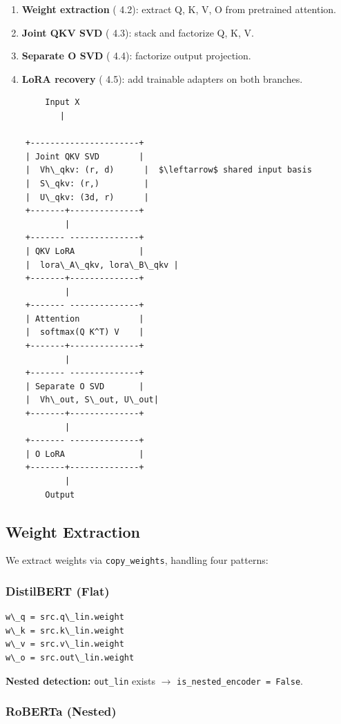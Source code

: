 \begin{enumerate}
\item \textbf{Weight extraction} ( 4.2): extract Q, K, V, O from pretrained attention.
\item \textbf{Joint QKV SVD} ( 4.3): stack and factorize Q, K, V.
\item \textbf{Separate O SVD} ( 4.4): factorize output projection.
\item \textbf{LoRA recovery} ( 4.5): add trainable adapters on both branches.

\end{enumerate}
\begin{lstlisting}
        Input X
           |
            
    +----------------------+
    | Joint QKV SVD        |
    |  Vh\_qkv: (r, d)      |  $\leftarrow$ shared input basis
    |  S\_qkv: (r,)         |
    |  U\_qkv: (3d, r)      |
    +-------+--------------+
            |
    +------- --------------+
    | QKV LoRA             |
    |  lora\_A\_qkv, lora\_B\_qkv |
    +-------+--------------+
            |
    +------- --------------+
    | Attention            |
    |  softmax(Q K^T) V    |
    +-------+--------------+
            |
    +------- --------------+
    | Separate O SVD       |
    |  Vh\_out, S\_out, U\_out|
    +-------+--------------+
            |
    +------- --------------+
    | O LoRA               |
    +-------+--------------+
            |
        Output
\end{lstlisting}

\subsection{Weight Extraction}

We extract weights via \texttt{copy\_weights}, handling four patterns:

\subsubsection{DistilBERT (Flat)}

\begin{lstlisting}
w\_q = src.q\_lin.weight
w\_k = src.k\_lin.weight
w\_v = src.v\_lin.weight
w\_o = src.out\_lin.weight
\end{lstlisting}

\textbf{Nested detection:} \texttt{out\_lin} exists $\to$ \texttt{is\_nested\_encoder = False}.

\subsubsection{RoBERTa (Nested)}

